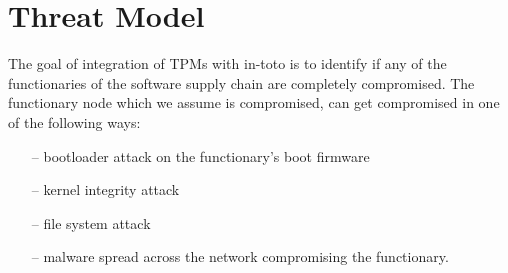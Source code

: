 \section{Threat Model}
The goal of integration of TPMs with in-toto is to identify if any of the functionaries of the software supply chain are completely compromised. The functionary node which we assume is compromised, can get compromised in one of the following ways:
\begin{itemize}
\item[--] bootloader attack on the functionary's boot firmware
\item[--] kernel integrity attack
\item[--] file system attack
\item[--] malware spread across the network compromising the functionary.
\end{itemize}
